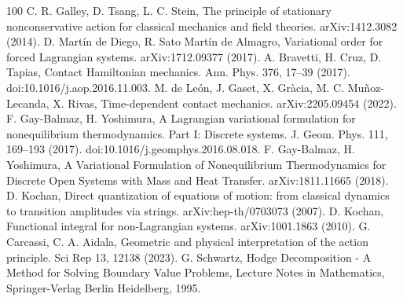 \documentclass[12pt]{article}
\begin{document}
\begin{thebibliography}{100}
 C. R. Galley, D. Tsang, L. C. Stein, The principle of stationary nonconservative action for classical mechanics and field theories. arXiv:1412.3082 (2014).
 D. Mart\'in de Diego, R. Sato Mart\'in de Almagro, Variational order for forced Lagrangian systems. arXiv:1712.09377 (2017).
 A. Bravetti, H. Cruz, D. Tapias, Contact Hamiltonian mechanics. Ann. Phys. 376, 17--39 (2017). doi:10.1016/j.aop.2016.11.003.
 M. de Le\'on, J. Gaset, X. Gr\`acia, M. C. Mu\~noz-Lecanda, X. Rivas, Time-dependent contact mechanics. arXiv:2205.09454 (2022).
 F. Gay-Balmaz, H. Yoshimura, A Lagrangian variational formulation for nonequilibrium thermodynamics. Part I: Discrete systems. J. Geom. Phys. 111, 169--193 (2017). doi:10.1016/j.geomphys.2016.08.018.
 F. Gay-Balmaz, H. Yoshimura, A Variational Formulation of Nonequilibrium Thermodynamics for Discrete Open Systems with Mass and Heat Transfer. arXiv:1811.11665 (2018).
 D. Kochan, Direct quantization of equations of motion: from classical dynamics to transition amplitudes via strings. arXiv:hep-th/0703073 (2007).
 D. Kochan, Functional integral for non-Lagrangian systems. arXiv:1001.1863 (2010).
 G. Carcassi, C. A. Aidala, Geometric and physical interpretation of the action principle. Sci Rep 13, 12138 (2023).
 G. Schwartz, Hodge Decomposition - A Method for Solving Boundary Value Problems, Lecture Notes in Mathematics, Springer-Verlag Berlin Heidelberg, 1995.
\end{thebibliography}
\end{document}
